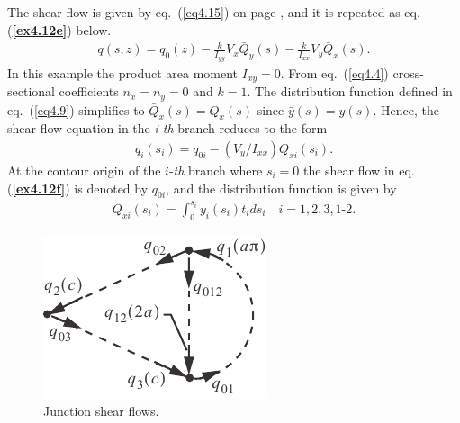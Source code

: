 \documentclass{AeroStructure-ERJohnson}
\begin{document}
\begin{example}
The shear flow is given by eq.~(\ref{eq4.15}) on page \pageref{eq4.15}, and it is repeated as eq. (\textbf{\ref{ex4.12e}}) below.
\begin{align}\label{ex4.12e}
q(s, z)=q_{0}(z)-\frac{k}{I_{y y}} V_{x} \bar{Q}_{y}(s)-\frac{k}{I_{x x}} V_{y} \bar{Q}_{x}(s).
\end{align}
In this example the product area moment $I_{x y}=0$. From eq.~(\ref{eq4.4}) cross-sectional coefficients $n_{x}=n_{y}=0$ and $k=1$. The distribution function defined in eq.~(\ref{eq4.9}) simplifies to $\bar{Q}_{x}(s)=Q_{x}(s)$ since $\bar{y}(s)=y(s)$. Hence, the shear flow equation in the \textit{i-th} branch reduces to the form
\begin{align}\label{ex4.12f}
q_{i}\left(s_{i}\right)=q_{0 i}-\left(V_{y}/I_{x x}\right) Q_{x i}\left(s_{i}\right).
\end{align}
At the contour origin of the $i$-\textit{th} branch where $s_{i}=0$ the shear flow in eq. (\textbf{\ref{ex4.12f}}) is denoted by $q_{0 i}$, and the distribution function is given by
\begin{align}\label{ex4.12g}
Q_{x i}\left(s_{i}\right)=\int_{0}^{s_{i}} y_{i}\left(s_{i}\right) t_{i} d s_{i} \quad i=1,2,3,\textrm{1-2}.
\end{align}
\begin{figure}
\vspace{-19pt}
\includegraphics{Figure_4-40.pdf}
\caption{Junction shear flows.\label{fig4.40}}
\end{figure}

\removelastskip


\end{example}
\end{document}
